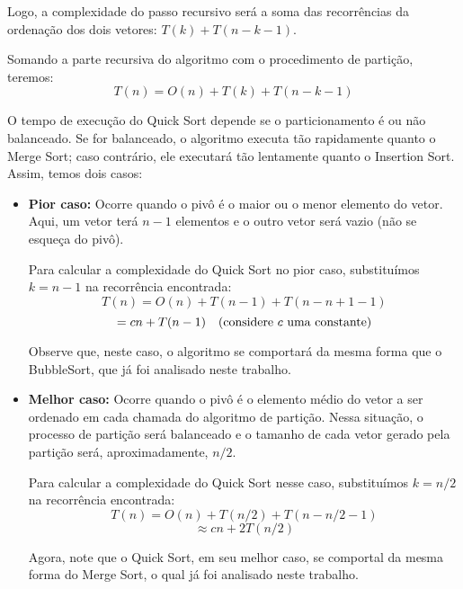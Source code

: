 Logo, a complexidade do passo recursivo será a soma das recorrências da ordenação dos dois vetores: \( T(k) + T(n - k - 1) \).

Somando a parte recursiva do algoritmo com o procedimento de partição, teremos:
\[
	T(n) = O(n) + T(k) + T(n - k - 1)
\]

O tempo de execução do Quick Sort depende se o particionamento é ou não balanceado. Se for balanceado, o algoritmo executa tão rapidamente quanto o Merge Sort; caso contrário, ele executará tão lentamente quanto o Insertion Sort. Assim, temos dois casos:

\begin{itemize}
	\item \textbf{Pior caso:} Ocorre quando o pivô é o maior ou o menor elemento do vetor. Aqui, um vetor terá \( n-1 \) elementos e o outro vetor será vazio (não se esqueça do pivô).

	      Para calcular a complexidade do Quick Sort no pior caso, substituímos \( k = n - 1 \) na recorrência encontrada:
	      \[
		      T(n) = O(n) + T(n-1) + T(n - n + 1 - 1)
	      \]
	      \[
		      = cn + T(n-1) \quad \text{(considere \( c \) uma constante)}
	      \]

	      Observe que, neste caso, o algoritmo se comportará da mesma forma que o BubbleSort, que já foi analisado neste trabalho.

	\item \textbf{Melhor caso:} Ocorre quando o pivô é o elemento médio do vetor a ser ordenado em cada chamada do algoritmo de partição. Nessa situação, o processo de partição será balanceado e o tamanho de cada vetor gerado pela partição será, aproximadamente, \( n/2 \).

	      Para calcular a complexidade do Quick Sort nesse caso, substituímos \( k = n/2 \) na recorrência encontrada:
	      \[
		      T(n) = O(n) + T(n/2) + T(n - n/2 - 1)
	      \]
	      \[
		      \approx cn + 2T(n/2)
	      \]

	      Agora, note que o Quick Sort, em seu melhor caso, se comportal da mesma forma do Merge Sort, o qual já foi analisado neste trabalho.

\end{itemize}

